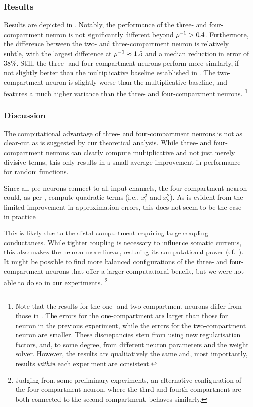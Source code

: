 \subsubsection{Results}
Results are depicted in .
Notably, the performance of the three- and four-compartment neuron is not significantly different beyond ${\rho^{-1}} > 0.4$.
Furthermore, the difference between the two- and three-compartment neuron is relatively subtle, with the largest difference at ${\rho^{-1}} \approx 1.5$ and a median reduction in error of $38\%$.
Still, the three- and four-compartment neurons perform more similarly, if not slightly better than the multiplicative baseline established in .
The two-compartment neuron is slightly worse than the multiplicative baseline, and features a much higher variance than the three- and four-compartment neurons.%
\footnote{Note that the results for the one- and two-compartment neurons differ from those in .
The errors for the one-compartment are larger than those for \LIF neuron in the previous experiment, while the errors for the two-compartment neuron are smaller.
These discrepancies stem from using new regularisation factors, and, to some degree, from different neuron parameters and the \SQP weight solver.
However, the results are qualitatively the same and, most importantly, results \emph{within} each experiment are consistent.}

\subsubsection{Discussion}
The computational advantage of three- and four-compartment neurons is not as clear-cut as is suggested by our theoretical analysis.
While three- and four-compartment neurons can clearly compute multiplicative and not just merely divisive terms, this only results in a small average improvement in performance for random functions.

Since all pre-neurons connect to all input channels, the four-compartment neuron could, as per , compute quadratic terms (i.e., $x_1^2$ and $x_2^2$).
As is evident from the limited improvement in approximation errors, this does not seem to be the case in practice.

This is likely due to the distal compartment requiring large coupling conductances.
While tighter coupling is necessary to influence somatic currents, this also makes the neuron more linear, reducing its computational power (cf.~).
It might be possible to find more balanced configurations of the three- and four-compartment neurons that offer a larger computational benefit, but we were not able to do so in our experiments.%
\footnote{Judging from some preliminary experiments, an alternative configuration of the four-compartment neuron, where the third and fourth compartment are both connected to the second compartment, behaves similarly.
}

